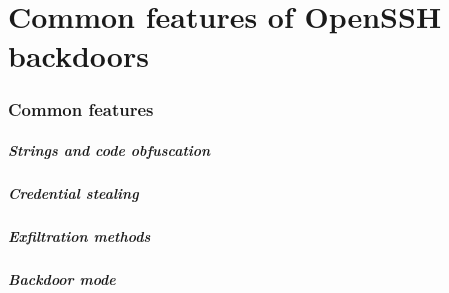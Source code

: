 \part{Common features of OpenSSH backdoors}
\section{Common features}

\begin{frame}
	\partpage
\end{frame}

\begin{frame}
	\frametitle{Strings and code obfuscation}
\end{frame}

\begin{frame}
	\frametitle{Credential stealing}
\end{frame}

\begin{frame}
	\frametitle{Exfiltration methods}
\end{frame}

\begin{frame}
	\frametitle{Backdoor mode}
\end{frame}
